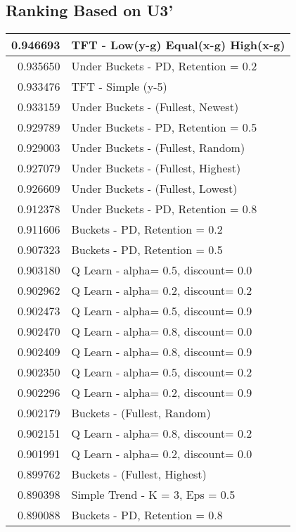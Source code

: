 \begin{table}[!hbtp]
\subsection{Ranking Based on U3'}
\begin{footnotesize}
\begin{tabular}{|r|l|}\hline  \label{U3results}
0.946693 & TFT - Low(y-g) Equal(x-g) High(x-g)\\ \hline
0.935650 & Under Buckets - PD, Retention = 0.2\\ \hline
0.933476 & TFT - Simple (y-5)\\ \hline
0.933159 & Under Buckets - (Fullest, Newest)\\ \hline
0.929789 & Under Buckets - PD, Retention = 0.5\\ \hline
0.929003 & Under Buckets - (Fullest, Random)\\ \hline
0.927079 & Under Buckets - (Fullest, Highest)\\ \hline
0.926609 & Under Buckets - (Fullest, Lowest)\\ \hline
0.912378 & Under Buckets - PD, Retention = 0.8\\ \hline
0.911606 & Buckets - PD, Retention = 0.2\\ \hline
0.907323 & Buckets - PD, Retention = 0.5\\ \hline
0.903180 & Q Learn - alpha= 0.5, discount= 0.0\\ \hline
0.902962 & Q Learn - alpha= 0.2, discount= 0.2\\ \hline
0.902473 & Q Learn - alpha= 0.5, discount= 0.9\\ \hline
0.902470 & Q Learn - alpha= 0.8, discount= 0.0\\ \hline
0.902409 & Q Learn - alpha= 0.8, discount= 0.9\\ \hline
0.902350 & Q Learn - alpha= 0.5, discount= 0.2\\ \hline
0.902296 & Q Learn - alpha= 0.2, discount= 0.9\\ \hline
0.902179 & Buckets - (Fullest, Random)\\ \hline
0.902151 & Q Learn - alpha= 0.8, discount= 0.2\\ \hline
0.901991 & Q Learn - alpha= 0.2, discount= 0.0\\ \hline
0.899762 & Buckets - (Fullest, Highest)\\ \hline
0.890398 & Simple Trend - K = 3, Eps = 0.5\\ \hline
0.890088 & Buckets - PD, Retention = 0.8\\ \hline

\end{tabular}
\end{footnotesize}
\end{table}
